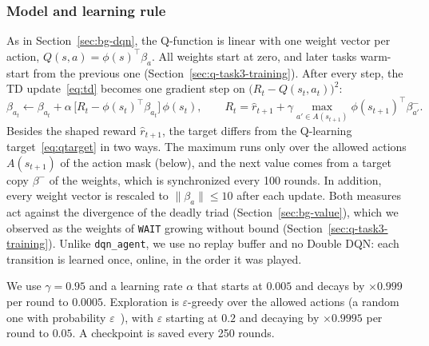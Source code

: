 \documentclass[11pt]{article}
\newcommand{\code}[1]{\texttt{#1}}
\begin{document}
\subsubsection{Model and learning rule}
As in Section~\ref{sec:bg-dqn}, the Q-function is linear with one weight vector per
action, $Q(s,a) = \phi(s)^\top \beta_a$. All weights start at zero, and later tasks
warm-start from the previous one (Section~\ref{sec:q-task3-training}). After every step, the TD
update~\eqref{eq:td} becomes one gradient step on
$\bigl(R_t - Q(s_t,a_t)\bigr)^2$:
\begin{equation}
  \beta_{a_t} \leftarrow \beta_{a_t}
    + \alpha\,\bigl[R_t - \phi(s_t)^\top \beta_{a_t}\bigr]\,\phi(s_t),
  \qquad
  R_t = \hat r_{t+1} + \gamma \max_{a' \in A(s_{t+1})} \phi(s_{t+1})^\top \beta^-_{a'} .
\end{equation}
Besides the shaped reward $\hat r_{t+1}$, the target differs from the Q-learning
target~\eqref{eq:qtarget} in two ways. The maximum runs only over the allowed actions
$A(s_{t+1})$ of the action mask (below), and the
next value comes from a target copy $\beta^-$ of the weights, which is synchronized
every 100 rounds. In addition, every weight vector is rescaled to
$\lVert\beta_a\rVert \le 10$ after each update. Both measures act against the
divergence of the deadly triad (Section~\ref{sec:bg-value}), which we observed as the
weights of \code{WAIT} growing without bound (Section~\ref{sec:q-task3-training}). Unlike
\code{dqn\_agent}, we use no replay buffer and no Double DQN: each transition is
learned once, online, in the order it was played.
 
We use $\gamma = 0.95$ and a learning rate $\alpha$ that starts at $0.005$ and decays
by $\times 0.999$ per round to $0.0005$. Exploration is $\varepsilon$-greedy over the
allowed actions (a random one with probability $\varepsilon$~\cite{sutton2018}), with
$\varepsilon$ starting at $0.2$ and decaying by $\times 0.9995$ per round to $0.05$. A
checkpoint is saved every 250 rounds.
 
\end{document}
